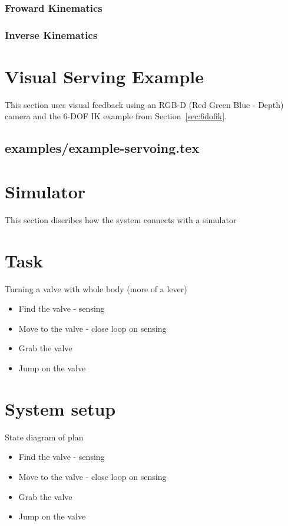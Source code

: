 		\subsubsection{Froward Kinematics} 
			
		\subsubsection{Inverse Kinematics}
			
			
\section{Visual Serving Example}
This section uses visual feedback using an RGB-D (Red Green Blue - Depth) camera and the 6-DOF IK example from Section~\ref{sec:6dofik}.
	\subsection{examples/example-servoing.tex}












\section{Simulator}\label{sec:simulator}
This section discribes how the system connects with a simulator 


\section{Task}\label{sec:task}
Turning a valve with whole body (more of a lever)
\begin{itemize}
\item Find the valve - sensing
\item Move to the valve - close loop on sensing
\item Grab the valve
\item Jump on the valve
\end{itemize}



\section{System setup}

State diagram of plan
\begin{itemize}
\item Find the valve - sensing
\item Move to the valve - close loop on sensing
\item Grab the valve
\item Jump on the valve
\end{itemize}

